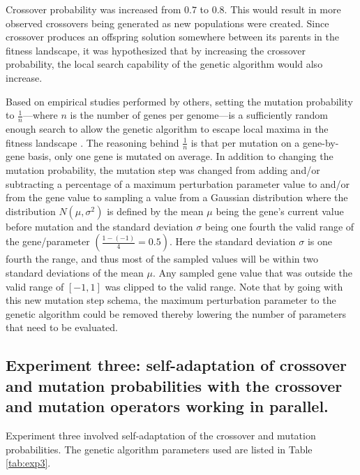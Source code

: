 Crossover probability was increased from $0.7$ to $0.8$. This would result in more observed crossovers being generated as new populations were created. Since crossover produces an offspring solution somewhere between its parents in the fitness landscape, it was hypothesized that by increasing the crossover probability, the local search capability of the genetic algorithm would also increase.

Based on empirical studies performed by others, setting the mutation probability to $\frac{1}{n}$---where $n$ is the number of genes per genome---is a sufficiently random enough search to allow the genetic algorithm to escape local maxima in the fitness landscape \cite{predictive_models}. The reasoning behind $\frac{1}{n}$ is that per mutation on a gene-by-gene basis, only one gene is mutated on average. In addition to changing the mutation probability, the mutation step was changed from adding and/or subtracting a percentage of a maximum perturbation parameter value to and/or from the gene value to sampling a value from a Gaussian distribution where the distribution $N(\mu,\sigma^2)$ is defined by the mean $\mu$ being the gene's current value before mutation and the standard deviation $\sigma$ being one fourth the valid range of the gene/parameter $\left(\frac{1-(-1)}{4}=0.5 \right)$. Here the standard deviation $\sigma$ is one fourth the range, and thus most of the sampled values will be within two standard deviations of the mean $\mu$. Any sampled gene value that was outside the valid range of $[-1,1]$ was clipped to the valid range. Note that by going with this new mutation step schema, the maximum perturbation parameter to the genetic algorithm could be removed thereby lowering the number of parameters that need to be evaluated. 

\subsection[Experiment Three]{Experiment three: self-adaptation of crossover and mutation probabilities with the crossover and mutation operators working in parallel.}

Experiment three involved self-adaptation of the crossover and mutation probabilities. The genetic algorithm parameters used are listed in Table \ref{tab:exp3}.

\renewcommand{\baselinestretch}{1.0}

